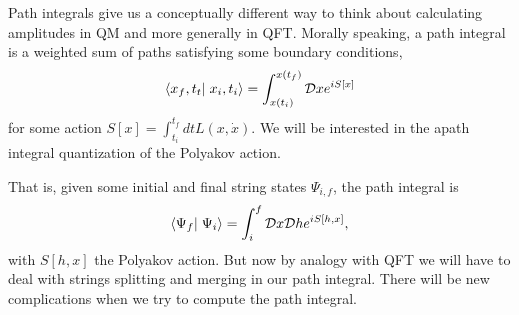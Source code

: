 Path integrals give us a conceptually different way to think about calculating amplitudes in QM and more generally in QFT. Morally speaking, a path integral is a weighted sum of paths satisfying some boundary conditions,
\begin{equation}
    \braket{x_f,t_t}{x_i,t_i}=\int_{x(t_i)}^{x(t_f)} \cD x e^{iS[x]}
\end{equation}
for some action $S[x]=\int_{t_i}^{t_f} dt L (x,\dot x)$. We will be interested in the apath integral quantization of the Polyakov action.

That is, given some initial and final string states $\Psi_{i,f}$, the path integral is
\begin{equation}
    \braket{\Psi_f}{\Psi_i}=\int_i^f \cD x \cD h e^{iS[h,x]},
\end{equation}
with $S[h,x]$ the Polyakov action. But now by analogy with QFT we will have to deal with strings splitting and merging in our path integral. There will be new complications when we try to compute the path integral.